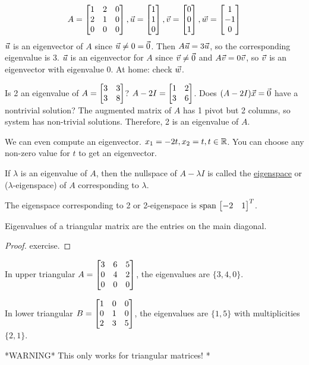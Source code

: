 \documentclass[10pt,a4paper]{article}
\begin{document}
\begin{example}
	$$A = \begin{bmatrix}1&2&0\\2&1&0\\0&0&0\end{bmatrix}, \vec{u} = \begin{bmatrix}1\\1\\0\end{bmatrix},\vec{v}=\begin{bmatrix}0\\0\\1\end{bmatrix},\vec{w}=\begin{bmatrix}1\\-1\\0\end{bmatrix}$$
	$\vec{u}$ is an eigenvector of $A$ since $\vec{u}\neq0=\vec{0}$. Then $A\vec{u} = 3\vec{u}$, so the corresponding eigenvalue is 3. $\vec{u}$ is an eigenvector for $A$ since $\vec{v}\neq\vec{0}$ and $A\vec{v} = 0\vec{v}$, so $\vec{v}$ is an eigenvector with eigenvalue 0. At home: check $\vec{w}$.
\end{example}
\begin{example}
	Is 2 an eigenvalue of $A = \begin{bmatrix}3&3\\3&8\end{bmatrix}$? $A-2I = \begin{bmatrix}1&2\\3&6\end{bmatrix}$. Does $(A-2I)\vec{x}=\vec{0}$ have a nontrivial solution? The augmented matrix of $A$ has 1 pivot but 2 columns, so system has non-trivial solutions. Therefore, 2 is an eigenvalue of $A$.
	
	We can even compute an eigenvector. $x_1=-2t,x_2=t,t\in\mathbb{R}$. You can choose any non-zero value for $t$ to get an eigenvector.
\end{example}
\begin{definition}
	If $\lambda$ is an eigenvalue of $A$, then the nullspace of $A-\lambda I$ is called the \underline{eigenspace} or ($\lambda$-eigenspace) of $A$ corresponding to $\lambda$.
\end{definition}
\begin{example}[Continued]
	The eigenspace corresponding to 2 or 2-eigenspace is $\text{span}\,\begin{bmatrix}-2 &1\end{bmatrix}^T$.
\end{example}
\begin{theorem}
	Eigenvalues of a triangular matrix are the entries on the main diagonal.
\end{theorem}
\begin{proof}
	exercise.
\end{proof}
\begin{example}
	In upper triangular $A = \begin{bmatrix}3&6&5\\0&4&2\\0&0&0\end{bmatrix}$, the eigenvalues are $\{3,4,0\}$.
	
	In lower triangular $B = \begin{bmatrix}1&0&0\\0&1&0\\2&3&5\end{bmatrix}$, the eigenvalues are $\{1,5\}$ with multiplicities $\{2,1\}$.
	
	*WARNING* This only works for triangular matrices! *
\end{example}
\end{document}
